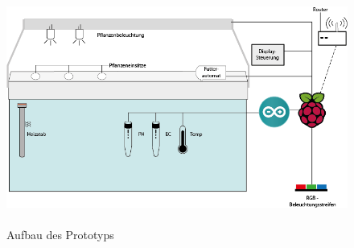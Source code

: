 \setcounter{page}{135}
\begin{figure}[ht]
    \centering
    \includegraphics[height=3in]{images/Aquarium_Modell}
    \caption{Aufbau des Prototyps \cite{RaspberryLogo, ArduinoLogo}}
\end{figure}